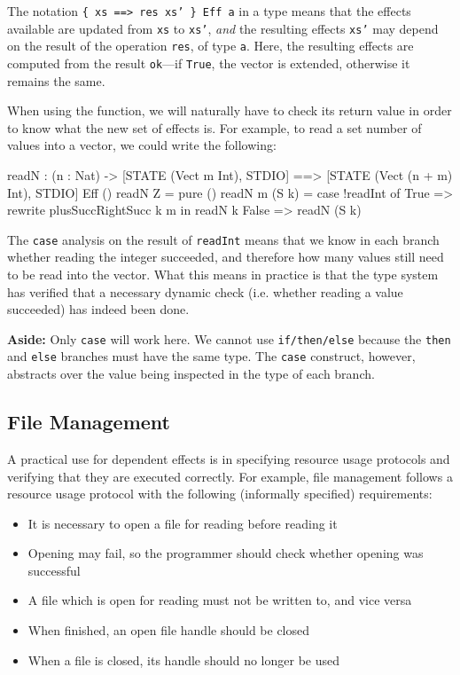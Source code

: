 \noindent
The notation \texttt{\{ xs ==> {res} xs' \} Eff a} in a type means that the
effects available are updated from \texttt{xs} to \texttt{xs'}, \emph{and}
the resulting effects \texttt{xs'} may depend on the result of the operation
\texttt{res}, of type \texttt{a}. Here, the resulting effects are computed
from the result \texttt{ok}---if \texttt{True}, the vector is extended, otherwise
it remains the same. 

When using the function, we will naturally have to check its return value
in order to know what the new set of effects is. For example, to read a set
number of values into a vector, we could write the following:

\begin{code}
readN : (n : Nat) ->
        { [STATE (Vect m Int), STDIO] ==>
          [STATE (Vect (n + m) Int), STDIO] } Eff ()
readN Z = pure ()
readN {m} (S k) = case !readInt of
                      True => rewrite plusSuccRightSucc k m in readN k
                      False => readN (S k)
\end{code}

\noindent
The \texttt{case} analysis on the result of \texttt{readInt} means that
we know in each branch whether reading the integer succeeded, and therefore
how many values still need to be read into the vector. What this means in
practice is that the type system has verified that a necessary dynamic
check (i.e. whether reading a value succeeded) has indeed been done.

\textbf{Aside:} Only \texttt{case} will work here. We cannot use
\texttt{if/then/else} because the \texttt{then} and \texttt{else} branches must
have the same type. The \texttt{case} construct, however,
abstracts over the value being inspected in the type of each branch.

\subsection{File Management}

A practical use for dependent effects is in specifying resource usage protocols
and verifying that they are executed correctly. For example, file management
follows a resource usage protocol with the following (informally specified)
requirements:

\begin{itemize}
\item It is necessary to open a file for reading before reading it
\item Opening may fail, so the programmer should check whether opening 
was successful
\item A file which is open for reading must not be written to, and vice versa
\item When finished, an open file handle should be closed
\item When a file is closed, its handle should no longer be used
\end{itemize}

